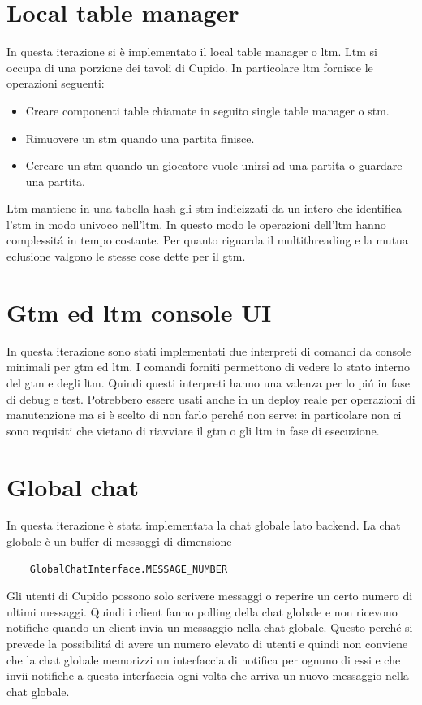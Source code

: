 \section{Local table manager}
  In questa iterazione si \`e implementato il local table manager o ltm. Ltm si occupa di una porzione dei tavoli di Cupido. In particolare ltm fornisce le operazioni seguenti:
  \begin{itemize}
    \item 
      Creare componenti table chiamate in seguito single table manager o stm.
    \item 
      Rimuovere un stm quando una partita finisce.
    \item 
      Cercare un stm quando un giocatore vuole unirsi ad una partita o guardare una partita.
  \end{itemize}
  Ltm mantiene in una tabella hash gli stm indicizzati da un intero che identifica l'stm in modo univoco nell'ltm. In questo modo le operazioni dell'ltm hanno complessit\'a in tempo costante.
  Per quanto riguarda il multithreading e la mutua eclusione valgono le stesse cose dette per il gtm.

\section{Gtm ed ltm console UI}
  In questa iterazione sono stati implementati due interpreti di comandi da console minimali per gtm ed ltm. I comandi forniti permettono di vedere lo stato interno del gtm e degli ltm. Quindi questi interpreti hanno una valenza per lo pi\'u in fase di debug e test. Potrebbero essere usati anche in un deploy reale per operazioni di manutenzione ma si \`e scelto di non farlo perch\'e non serve: in particolare non ci sono requisiti che vietano di riavviare il gtm o gli ltm in fase di esecuzione.

\section{Global chat}
  In questa iterazione \`e stata implementata la chat globale lato backend. La chat globale \`e un buffer di messaggi di dimensione 
  \begin{verbatim}
    GlobalChatInterface.MESSAGE_NUMBER
  \end{verbatim}
  Gli utenti di Cupido possono solo scrivere messaggi o reperire un certo numero di ultimi messaggi. Quindi i client fanno polling della chat globale e non ricevono notifiche quando un client invia un messaggio nella chat globale. Questo perch\'e si prevede la possibilit\'a di avere un numero elevato di utenti e quindi non conviene che la chat globale memorizzi un interfaccia di notifica per ognuno di essi e che invii notifiche a questa interfaccia ogni volta che arriva un nuovo messaggio nella chat globale.

